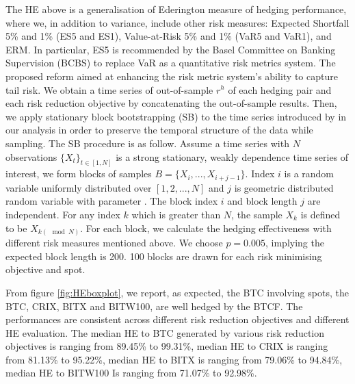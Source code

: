 The HE above is a generalisation of Ederington measure of hedging performance, where we,
in addition to variance, include other risk measures: Expected Shortfall 5\% and 1\% (ES5 and ES1), Value-at-Risk 5\% and 1\% (VaR5 and VaR1), and ERM.
In particular, ES5 is recommended by the Basel Committee on Banking Supervision (BCBS) to replace VaR as a quantitative risk metrics system.
The proposed reform aimed at enhancing the risk metric system's ability to capture tail risk. \medskip
%
We obtain a time series of out-of-sample $r^h$ of each hedging pair and each risk reduction objective by concatenating the out-of-sample results.
Then, we apply stationary block bootstrapping (SB) to the time series introduced by \cite{Politis1994} in our analysis in order to preserve the temporal structure of the data while sampling.
The SB procedure is as follow.
Assume a time series with $N$ observations $\{X_t\}_{t \in [1,N]}$ is a strong stationary, weakly dependence time series of interest,
we form blocks of samples $B = \{X_i, ..., X_{i+j-1}\}$.
Index $i$ is a random variable uniformly distributed over $[1,2,...,N]$ and $j$ is geometric distributed random variable with parameter .
The block index $i$ and block length $j$ are independent.
For any index $k$ which is greater than $N$, the sample $X_k$ is defined to be $X_{k(\mod N)}$.
For each block, we calculate the hedging effectiveness with different risk measures mentioned above.
We choose $p=0.005$, implying the expected block length is 200.
100 blocks are drawn for each risk minimising objective and spot. \medskip

From figure \ref{fig:HEboxplot}, we report, as expected, the BTC involving spots, the BTC, CRIX, BITX and BITW100, are well hedged by the BTCF.
The performances are consistent across different risk reduction objectives and different HE evaluation.
The median HE to BTC generated by various risk reduction objectives is ranging from 89.45\% to 99.31\%, median HE to CRIX is ranging from 81.13\% to 95.22\%,
median HE to BITX is ranging from 79.06\% to 94.84\%, median HE to BITW100 Is ranging from 71.07\% to 92.98\%. \medskip

